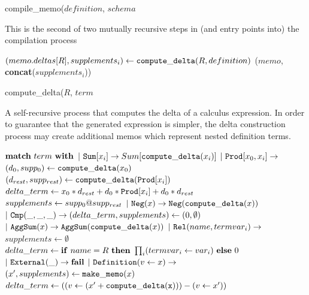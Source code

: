 \documentclass[11pt]{amsart}
\begin{document}
\begin{algorithm}
\caption{compile\_memo($definition$, $schema$}

This is the second of two mutually recursive steps in (and entry points into) the compilation process

\begin{algorithmic}
  \STATE $(memo.deltas[R], supplements_i) \gets {\tt compute\_delta}(R, definition)$
\ENDFOR
{} ($memo$, {\bf concat}($supplements_i$))
\end{algorithmic}
\end{algorithm}

\begin{algorithm}
\caption{compute\_delta($R$, $term$}
A self-recursive process that computes the delta of a calculus expression.  In order to guarantee that the generated expression is simpler, the delta construction process may create additional memos which represent nested definition terms.  

\begin{algorithmic}[1]
\STATE ${\bf match}\ term\ {\bf with}$
\STATE $|\ {\tt Sum}[x_i] \rightarrow Sum[{\tt compute\_delta}(x_i)]$
\STATE $|\ {\tt Prod}[x_0, x_i] \rightarrow$\\ \hspace*{0.5in} $(d_0,supp_0) \gets {\tt compute\_delta}(x_0)$\\ \hspace*{0.5in} $(d_{rest},supp_{rest}) \gets {\tt compute\_delta}({\tt Prod}[x_i])$\\ \hspace*{0.5in} $delta\_term \gets x_0 * d_{rest} + d_0 * {\tt Prod}[x_i] + d_0 * d_{rest}$\\ \hspace*{0.5in} $supplements \gets supp_0 {\bf @} supp_{rest}$
\STATE $|\ {\tt Neg}(x) \rightarrow {\tt Neg}({\tt compute\_delta}(x))$
\STATE $|\ {\tt Cmp}(\_,\_,\_) \rightarrow (delta\_term,supplements)\gets (0, \emptyset)$
\STATE $|\ {\tt AggSum}(x) \rightarrow {\tt AggSum}({\tt compute\_delta}(x))$
\STATE $|\ {\tt Rel}(name,termvar_i) \rightarrow $\\ \hspace*{0.5in} $supplements \gets \emptyset$\\ \hspace*{0.5in} $delta\_term \gets{\bf if}\ name = R\ {\bf then}\ \prod_i (termvar_i \gets var_i)\ {\bf else}\ 0$
\STATE $|\ {\tt External}(\_) \rightarrow {\bf fail}$
\STATE $|\ {\tt Definition}(v \gets x) \rightarrow $\\ \hspace*{0.5in} $(x',supplements) \gets {\tt make\_memo}(x)$\\ \hspace*{0.5in} $delta\_term \gets ((v \gets (x' + {\tt compute\_delta(x)})) - (v \gets x'))$
\end{algorithmic}
\end{algorithm}
\end{document}
